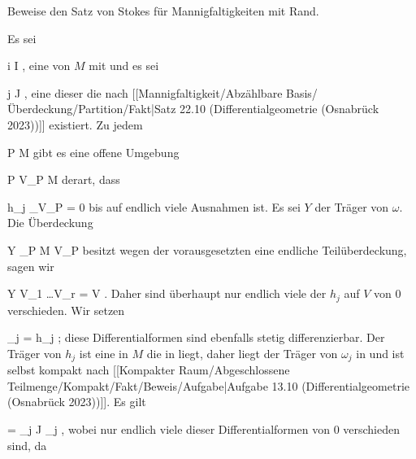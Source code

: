 {

Beweise den Satz von Stokes für Mannigfaltigkeiten mit Rand.

}
{

\teilbeweis {}{}{}
{Es sei

 {}
 {i \in I} {}
 {} {} {} {,}
eine
von $M$ mit
und es sei

 {}
 {j \in J} {}
 {} {} {} {,}
eine dieser
die nach
[[Mannigfaltigkeit/Abzählbare Basis/Überdeckung/Partition/Fakt|Satz 22.10 (Differentialgeometrie (Osnabrück 2023))]]
existiert. Zu jedem

\mavergleichskette
{\vergleichskette
{ P
}
{ \in }{ M
}
{  }{
}
{    }{
}
{   }{
}
}
{}{}{}
gibt es eine offene Umgebung

\mavergleichskette
{\vergleichskette
{ P
}
{ \in }{ V_P
}
{ \subseteq }{ M
}
{    }{
}
{   }{
}
}
{}{}{}
derart, dass

\mavergleichskette
{\vergleichskette
{ h_j \vert_{V_P }
}
{ = }{ 0
}
{  }{
}
{    }{
}
{   }{
}
}
{}{}{}
bis auf endlich viele Ausnahmen ist. Es sei $Y$ der Träger von $\omega$. Die Überdeckung

\mavergleichskette
{\vergleichskette
{ Y
}
{ \subseteq }{ \bigcup_{P \in M} V_P
}
{  }{
}
{    }{
}
{   }{
}
}
{}{}{}
besitzt wegen der vorausgesetzten
eine endliche Teilüberdeckung, sagen wir

\mavergleichskettedisp
{\vergleichskette
{ Y
}
{ \subseteq} { V_{1} \cup \ldots \cup V_{r}
}
{ =} { V
}
{ } {
}
{ } {
}
}
{}{}{.}
Daher sind überhaupt nur endlich viele der $h_j$ auf $V$ von $0$ verschieden. Wir setzen

\mavergleichskette
{\vergleichskette
{ \omega_j
}
{ = }{ h_j \omega
}
{  }{
}
{    }{
}
{   }{
}
}
{}{}{;}
diese Differentialformen sind ebenfalls stetig differenzierbar. Der Träger von $h_j$ ist eine in $M$
die in
 liegt, daher liegt der Träger von $\omega_j$ in
 und ist selbst kompakt nach
[[Kompakter Raum/Abgeschlossene Teilmenge/Kompakt/Fakt/Beweis/Aufgabe|Aufgabe 13.10 (Differentialgeometrie (Osnabrück 2023))]].
Es gilt

\mavergleichskettedisp
{\vergleichskette
{ \omega
}
{ =} { \sum_{j \in J} \omega_j
}
{ } {
}
{ } {
}
{ } {
}
}
{}{}{,}
wobei nur endlich viele dieser Differentialformen
 von $0$ verschieden sind, da

}}
